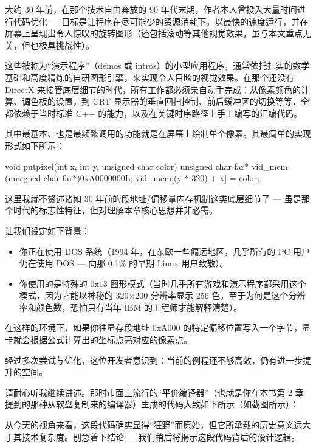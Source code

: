 
大约 30 年前，在那个技术自由奔放的 90 年代末期，作者本人曾投入大量时间进行代码优化 --- 目标是让程序在尽可能少的资源消耗下，以最快的速度运行，并在屏幕上呈现出令人惊叹的旋转图形（还包括滚动等其他视觉效果，虽与本文重点无关，但也极具挑战性）。

这些被称为“演示程序”（demos 或 intros）的小型应用程序，通常依托扎实的数学基础和高度精炼的自研图形引擎，来实现令人目眩的视觉效果。在那个还没有 DirectX 来接管底层细节的时代，所有工作都必须亲自动手完成：从像素颜色的计算、调色板的设置，到 CRT 显示器的垂直回扫控制、前后缓冲区的切换等等，全都依赖于当时标准 C++ 的能力，以及在关键时序路径上手工编写的汇编代码。

其中最基本、也是最频繁调用的功能就是在屏幕上绘制单个像素。其最简单的实现形式如下所示：

\begin{cpp}
void putpixel(int x, int y, unsigned char color) {
  unsigned char far* vid_mem = (unsigned char far*)0xA0000000L;
  vid_mem[(y * 320) + x] = color;
}
\end{cpp}

这里我就不赘述诸如 30 年前的段地址/偏移量内存机制这类底层细节了 --- 虽是那个时代的标志性特征，但对理解本章核心思想并非必需。

让我们设定如下背景：

\begin{itemize}
\item 
你正在使用 DOS 系统（1994 年，在东欧一些偏远地区，几乎所有的 PC 用户仍在使用 DOS --- 向那 0.1\% 的早期 Linux 用户致敬）。

\item 
你使用的是特殊的 0x13 图形模式（当时几乎所有游戏和演示程序都采用这个模式，因为它能以神秘的 320×200 分辨率显示 256 色。至于为何是这个分辨率和颜色数，恐怕只有当年 IBM 的工程师才能解释清楚）。
\end{itemize}

在这样的环境下，如果你往显存段地址 0xA000 的特定偏移位置写入一个字节，显卡就会根据公式计算出的坐标点亮对应的像素点。

经过多次尝试与优化，这位开发者意识到：当前的例程还不够高效，仍有进一步提升的空间。

请耐心听我继续讲述。那时市面上流行的“平价编译器”（也就是你在本书第 2 章提到的那种从软盘复制来的编译器）生成的代码大致如下所示（如截图所示）：


从今天的视角来看，这段代码确实显得“狂野”而原始，但它所承载的历史意义远大于其技术复杂度。别急着下结论 --- 我们稍后将揭示这段代码背后的设计逻辑。

